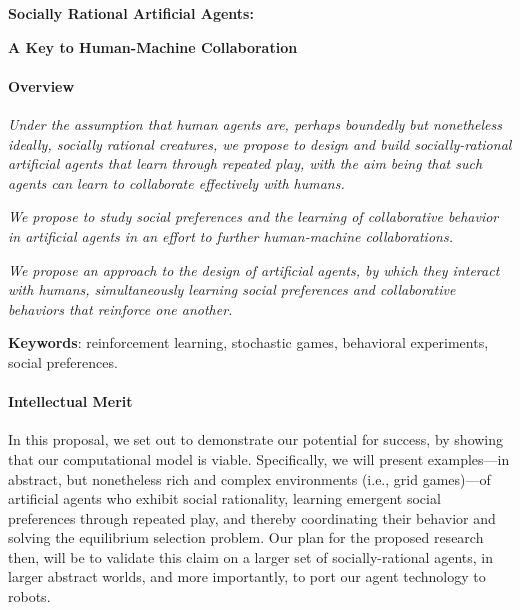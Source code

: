
\centerline{\Large \bf Socially Rational Artificial Agents:}

\vspace{\down}
\centerline{\large \bf A Key to Human-Machine Collaboration}

\vspace{\up}
\paragraph{Overview}

\emph{Under the assumption that human agents are, perhaps boundedly but
nonetheless ideally, socially rational creatures, we propose to design
and build socially-rational artificial agents that learn through
repeated play, with the aim being that such agents can learn to
collaborate effectively with humans.}

\emph{We propose to study social preferences and the learning of
collaborative behavior in artificial agents in an effort to further
human-machine collaborations.}

\emph{We propose an approach to the design of artificial agents,
by which they interact with humans, simultaneously learning social
preferences and collaborative behaviors that reinforce one another.}


{\bf Keywords}: reinforcement learning, stochastic games, behavioral experiments, social preferences.

\vspace{\up}
\paragraph{Intellectual Merit}

In this proposal, we set out to demonstrate our potential for success,
by showing that our computational model is viable.  Specifically, we
will present examples---in abstract, but nonetheless rich and complex
environments (i.e., grid games)---of artificial agents who exhibit
social rationality, learning emergent social preferences through
repeated play, and thereby coordinating their behavior and solving the
equilibrium selection problem.  Our plan for the proposed research
then, will be to validate this claim on a larger set of
socially-rational agents, in larger abstract worlds, and more
importantly, to port our agent technology to robots.



